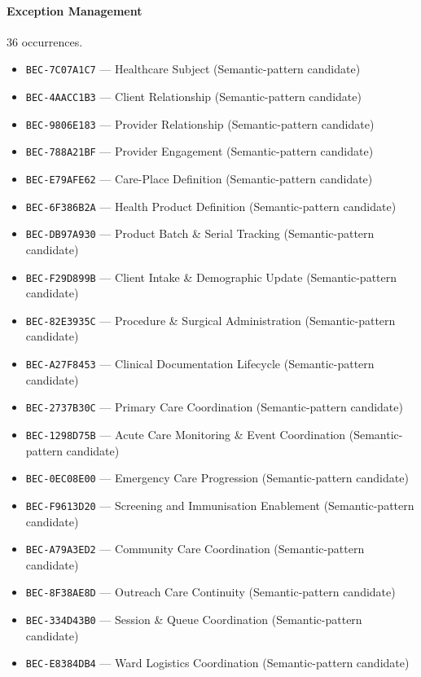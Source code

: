 \documentclass[11pt,a4paper,openany]{book}
\begin{document}
\paragraph{Exception Management} 36 occurrences.\par
\begin{itemize}
\item \texttt{BEC-7C07A1C7} --- Healthcare Subject (Semantic-pattern candidate)
\item \texttt{BEC-4AACC1B3} --- Client Relationship (Semantic-pattern candidate)
\item \texttt{BEC-9806E183} --- Provider Relationship (Semantic-pattern candidate)
\item \texttt{BEC-788A21BF} --- Provider Engagement (Semantic-pattern candidate)
\item \texttt{BEC-E79AFE62} --- Care-Place Definition (Semantic-pattern candidate)
\item \texttt{BEC-6F386B2A} --- Health Product Definition (Semantic-pattern candidate)
\item \texttt{BEC-DB97A930} --- Product Batch \& Serial Tracking (Semantic-pattern candidate)
\item \texttt{BEC-F29D899B} --- Client Intake \& Demographic Update (Semantic-pattern candidate)
\item \texttt{BEC-82E3935C} --- Procedure \& Surgical Administration (Semantic-pattern candidate)
\item \texttt{BEC-A27F8453} --- Clinical Documentation Lifecycle (Semantic-pattern candidate)
\item \texttt{BEC-2737B30C} --- Primary Care Coordination (Semantic-pattern candidate)
\item \texttt{BEC-1298D75B} --- Acute Care Monitoring \& Event Coordination (Semantic-pattern candidate)
\item \texttt{BEC-0EC08E00} --- Emergency Care Progression (Semantic-pattern candidate)
\item \texttt{BEC-F9613D20} --- Screening and Immunisation Enablement (Semantic-pattern candidate)
\item \texttt{BEC-A79A3ED2} --- Community Care Coordination (Semantic-pattern candidate)
\item \texttt{BEC-8F38AE8D} --- Outreach Care Continuity (Semantic-pattern candidate)
\item \texttt{BEC-334D43B0} --- Session \& Queue Coordination (Semantic-pattern candidate)
\item \texttt{BEC-E8384DB4} --- Ward Logistics Coordination (Semantic-pattern candidate)

\end{itemize}
\end{document}
